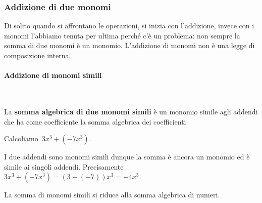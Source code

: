 


\subsubsection{Addizione di due monomi}
\label{subsubsec:monomi_addizione}

Di solito quando si affrontano le operazioni, si inizia con l'addizione, 
invece con i monomi l'abbiamo tenuta per ultima perché c'è un problema: 
non sempre la somma di due monomi è un monomio. 
L'addizione di monomi non è una legge di composizione interna.

\paragraph{Addizione di monomi simili}
~

\begin{definizione}{}{}
La \textbf{somma algebrica di due monomi simili} è un monomio simile agli
addendi che ha come coefficiente la somma algebrica dei 
coefficienti.
\end{definizione}

\begin{esempio}{}{}
Calcoliamo~\(3x^{3}+(-7x^{3})\).

I due addendi sono monomi simili dunque la somma è ancora un monomio
ed è simile ai singoli addendi. Precisamente
\(3x^{3}+(-7x^{3})=(3+(-7))x^{3}=-4x^{3}\).

La somma di monomi simili si riduce alla somma algebrica di numeri.
\end{esempio}


% 
% 

